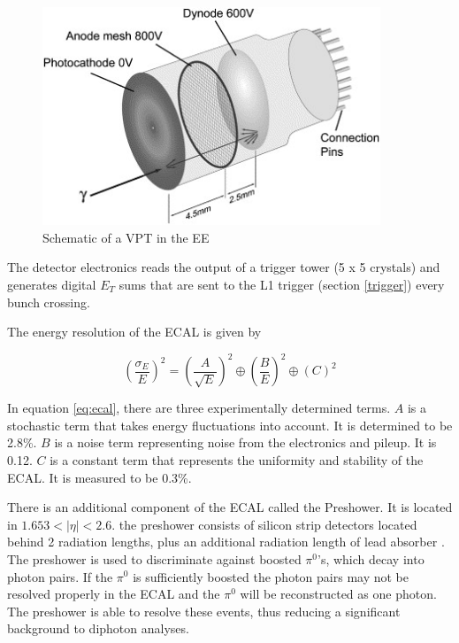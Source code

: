 \documentclass[oneside, letterpaper, oldfontcommands]{memoir}
\begin{document}
\begin{figure}[here]
\includegraphics[width=0.9\textwidth]{vpt.jpg}
\caption{Schematic of a VPT in the EE  \cite{Brown:2007cg}}
\label{fig:VPT}
\end{figure}

\qquad The detector electronics reads the output of a trigger tower (5 x 5 crystals) and generates digital $E_{T}$ sums that are sent to the L1 trigger (section \ref{trigger}) every bunch crossing.

\qquad The energy resolution of the ECAL is given by 

\begin{equation}
\label{eq:ecal}
\left(\frac{\sigma_{E}}{E}\right)^{2} = \left(\frac{A}{\sqrt{E}}\right)^{2} \oplus \left(\frac{B}{E}\right)^{2} \oplus \left( C \right)^{2}
\end{equation} 


In equation \ref{eq:ecal}, there are three experimentally determined terms. $A$ is a stochastic term that takes energy fluctuations into account. It is determined to be 2.8\%. $B$ is a noise term representing noise from the electronics and pileup. It is 0.12. $C$ is a constant term that represents the uniformity and stability of the ECAL. It is measured to be 0.3\%. 

\qquad There is an additional component of the ECAL called the Preshower. It is located in $1.653 < |\eta| < 2.6$. the preshower consists of silicon strip detectors located behind 2 radiation lengths, plus an additional radiation length of lead absorber \cite{Cockerill:2008td}. The preshower is used to discriminate against boosted $\pi^{0}$'s, which decay into photon pairs. If the $\pi^{0}$ is sufficiently boosted the photon pairs may not be resolved properly in the ECAL and the $\pi^{0}$ will be reconstructed as one photon. The preshower is able to resolve these events, thus reducing a significant background to diphoton analyses.
\end{document}

